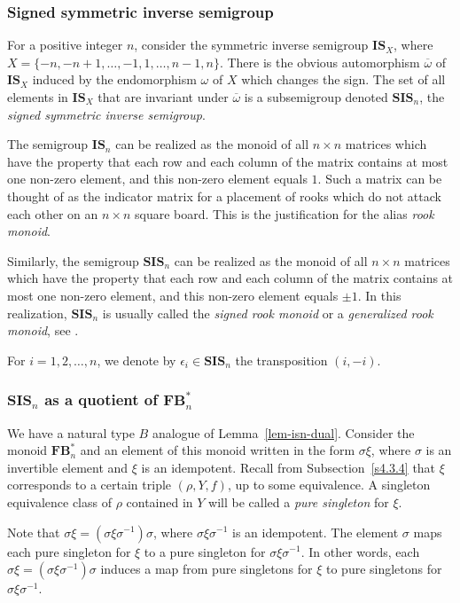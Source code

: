 \documentclass[a4paper]{amsart}
\begin{document}
\subsubsection{Signed symmetric inverse semigroup}\label{s4.2.4}

For a positive integer $n$, consider the symmetric inverse semigroup 
$\mathbf{IS}_X$, where $X=\{-n,-n+1,\dots,-1,1,\dots,n-1,n\}$. There is the obvious 
automorphism $\overline{\omega}$ of $\mathbf{IS}_X$ induced by the 
endomorphism $\omega$ of $X$ which changes the sign. The set of all elements 
in $\mathbf{IS}_X$ that are invariant under $\overline{\omega}$ is a subsemigroup
denoted $\mathbf{SIS}_n$, the {\em  signed symmetric inverse semigroup}.

The semigroup $\mathbf{IS}_n$ can be realized as the monoid of all $n\times n$
matrices which have the property that each row and each column of the matrix
contains at most one non-zero element, and this non-zero element equals $1$.
Such a matrix can be thought of as the indicator matrix for a placement of 
rooks which do not attack each other on an $n\times n$ square board. 
This is the justification for the alias {\em rook monoid}. 

Similarly, the semigroup $\mathbf{SIS}_n$ can be realized as the monoid of all $n\times n$
matrices which have the property that each row and each column of the matrix
contains at most one non-zero element, and this non-zero element equals $\pm 1$.
In this realization, $\mathbf{SIS}_n$ is usually called the {\em signed rook monoid}
or a {\em generalized rook monoid}, see \cite{MaSr}. 

For $i=1,2,\dots,n$, we denote by $\epsilon_i\in \mathbf{SIS}_n$ the transposition
$(i,-i)$. 

\subsubsection{$\mathbf{SIS}_n$ as a quotient of $\mathbf{FB}^*_n$}\label{s4.2.45}

We have a natural type $B$ analogue of Lemma~\ref{lem-isn-dual}.
Consider the monoid $\mathbf{FB}^*_n$ and an element 
of this monoid written in the form $\sigma\xi$, where $\sigma$ is an
invertible element and $\xi$ is an idempotent. Recall from Subsection~\ref{s4.3.4}
that $\xi$ corresponds to a certain triple $(\rho,Y,f)$, up to some equivalence.
A singleton equivalence class  of $\rho$  contained in $Y$
will be called a {\em pure singleton} for $\xi$.

Note that $\sigma\xi=(\sigma\xi\sigma^{-1})\sigma$, where $\sigma\xi\sigma^{-1}$
is an idempotent. The element $\sigma$ maps each pure singleton for $\xi$
to a pure singleton for $\sigma\xi\sigma^{-1}$. In other words, each 
$\sigma\xi=(\sigma\xi\sigma^{-1})\sigma$ induces a map  from pure singletons for $\xi$
to pure singletons for $\sigma\xi\sigma^{-1}$.
\end{document}
